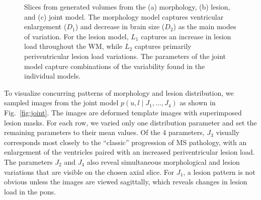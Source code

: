 \begin{figure}[tb]
{
} \caption[Slices from generated volumes from the morphology, lesion,
and joint model]{Slices from generated volumes from the (a) morphology, (b)
lesion, and (c) joint model. The morphology model captures ventricular
enlargement ($D_1$) and decrease in brain size ($D_2$) as the main modes of
variation. For the lesion model, $L_1$ captures an increase in lesion load
throughout the WM, while $L_2$ captures primarily periventricular lesion load
variations. The parameters of the joint model capture combinations
of the variability found in the individual models.}
\label{fig:samples}
\end{figure}

To visualize concurring patterns of morphology and lesion distribution, we
sampled images from the joint model $p(u, l \mid J_1, \dotsc, J_4)$ as shown in
Fig.~\ref{fig:joint}. The images are deformed template images with superimposed
lesion masks. For each row, we varied only one distribution parameter and set
the remaining parameters to their mean values. Of the 4 parameters, $J_3$
visually corresponds most closely to the ``classic'' progression of MS
pathology, with an enlargement of the ventricles paired with an increased
periventricular lesion load. The parameters $J_2$ and $J_4$ also reveal
simultaneous morphological and lesion variations that are visible on the chosen
axial slice. For $J_1$, a lesion pattern is not obvious unless the images are
viewed sagittally, which reveals changes in lesion load in the pons.

